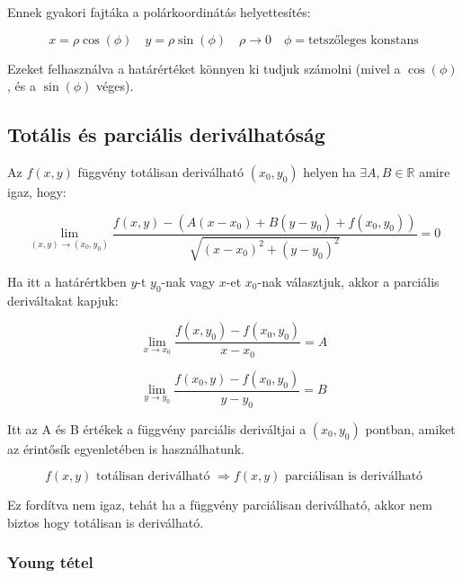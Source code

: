 \documentclass{article}
\begin{document}
\vspace{4mm}

Ennek gyakori fajtáka a polárkoordinátás helyettesítés:

\begin{equation*}
    x = \rho \cos(\phi) \quad y = \rho \sin(\phi) \quad \rho \to 0 \quad \phi = \text{tetszőleges konstans}
\end{equation*}

Ezeket felhasználva a határértéket könnyen ki tudjuk számolni (mivel a $\cos(\phi)$, és a $\sin(\phi)$ véges).

\subsection{Totális és parciális deriválhatóság}

Az $f(x,y)$ függvény totálisan deriválható $(x_0, y_0)$ helyen ha $\exists A,B \in \mathbb{R}$ amire igaz, hogy:

\begin{equation*}
    \lim_{(x,y) \to (x_0, y_0)} \frac{f(x,y) - (A(x-x_0) + B(y-y_0) + f(x_0, y_0))}{\sqrt{(x-x_0)^2 + (y-y_0)^2}} = 0
\end{equation*}

Ha itt a határértkben $y$-t $y_0$-nak vagy $x$-et $x_0$-nak vá\-laszt\-juk, ak\-kor a par\-ci\-á\-lis de\-ri\-vál\-ta\-kat kapjuk:

\begin{equation*}
    \lim_{x \to x_0} \frac{f(x,y_0) - f(x_0, y_0)}{x-x_0} = A
\end{equation*}

\begin{equation*}
    \lim_{y \to y_0} \frac{f(x_0,y) - f(x_0, y_0)}{y-y_0} = B
\end{equation*}

Itt az A és B értékek a függvény parciális deriváltjai a $(x_0, y_0)$ pontban, amiket az érintősík egyenletében is használhatunk.

\begin{equation*}
    f(x,y) \text{ totálisan deriválható } \Rightarrow f(x,y) \text{ parciálisan is deriválható}
\end{equation*}

Ez fordítva nem igaz, tehát ha a függvény parciálisan deriválható, akkor nem biztos hogy totálisan is deriválható.

\subsubsection{Young tétel}
\end{document}
